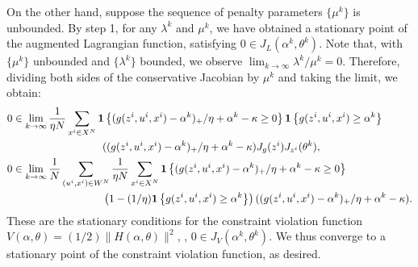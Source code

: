 \documentclass[11pt]{article}
\newcommand{\bsnote}[1]{\noindent\textcolor{red}{\texttt{Bartolomeo: #1}}}
\newcommand{\RC}[1]{\textcolor{black}{#1}}
\begin{document}
\begin{appendices}
On the other hand, suppose the sequence of penalty parameters $\{\mu^k\}$ is unbounded. By step 1, for any $\lambda^k$ and $\mu^k$, we have obtained a stationary point of the augmented Lagrangian function, satisfying $0 \in J_L(\alpha^k,\theta^k)$.
Note that, with $\{\mu^k\}$ unbounded and $\{\lambda^k\}$ bounded, we observe $\lim_{k \rightarrow \infty} \lambda^k/
\mu^k = 0$. 
Therefore, dividing both sides of the conservative Jacobian by $\mu^k$ and taking the limit, we obtain:
\RC{\begin{equation*}
\begin{aligned}
0 & \in \lim_{k \rightarrow \infty}  \frac{1}{\eta N}\sum_{x^i \in X^N} \ones\left\{(g(z^i,u^i,x^i) - \alpha^k)_+/\eta + \alpha^k - \kappa \geq 0\right\} \ones\left\{g(z^i,u^i,x^i) \geq \alpha^k\right\}\\
&\hspace{3cm}((g(z^i,u^i,x^i)- \alpha^k)_+/\eta + \alpha^k - \kappa) J_{g}(z^i) J_{z^i}(\theta^k),\\
0 & \in \lim_{k \rightarrow \infty} \frac{1}{N}\sum_{(u^i,x^i)\in W^N} \frac{1}{\eta N}\sum_{x^i \in X^N} \ones\left\{(g(z^i,u^i,x^i) - \alpha^k)_+/\eta + \alpha^k - \kappa \geq 0\right\}\\
&\hspace{3cm}\left(1 - (1/\eta)\ones\left\{g(z^i,u^i,x^i) \geq \alpha^k\right\} \right)((g(z^i,u^i,x^i)- \alpha^k)_+/\eta + \alpha^k - \kappa).\\
\end{aligned}
\end{equation*}}
These are the stationary conditions for the constraint violation function $V(\alpha,\theta) = (1/2)\|H(\alpha,\theta)\|^2$, \ie, $0 \in J_V(\alpha^k,\theta^k)$. 
We thus converge to a stationary point of the constraint violation function, as desired. 



\end{appendices}
\end{document}
